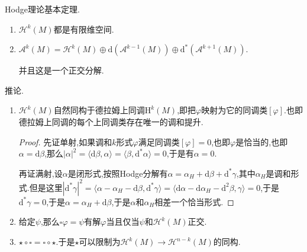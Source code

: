 Hodge理论基本定理.
\begin{enumerate}
	\item $\mathscr{H}^k(M)$都是有限维空间.
	\item $\mathscr{A}^k(M)=\mathscr{H}^k(M)\oplus\mathrm{d}\left(\mathscr{A}^{k-1}(M)\right)\oplus\mathrm{d}^*\left(\mathscr{A}^{k+1}(M)\right)$.
	
	并且这是一个正交分解.
\end{enumerate}

推论.
\begin{enumerate}
	\item $\mathscr{H}^k(M)$自然同构于德拉姆上同调$\mathrm{H}^k(M)$,即把$\varphi$映射为它的同调类$[\varphi]$.也即德拉姆上同调的每个上同调类存在唯一的调和提升.
	\begin{proof}
		
		先证单射,如果调和$k$形式$\varphi$满足同调类$[\varphi]=0$,也即$\varphi$是恰当的,也即$\alpha=\mathrm{d}\beta$,那么$|\alpha|^2=\langle\mathrm{d}\beta,\alpha\rangle=\langle\beta,\mathrm{d}^*\alpha\rangle=0$,于是有$\alpha=0$.
		
		\qquad
		
		再证满射,设$\alpha$是闭形式,按照Hodge分解有$\alpha=\alpha_H+\mathrm{d}\beta+\mathrm{d}^*\gamma$,其中$\alpha_H$是调和形式.但是这里$|\mathrm{d}^*\gamma|^2=\langle\alpha-\alpha_H-\mathrm{d}\beta,\mathrm{d}^*\gamma\rangle=\langle\mathrm{d}\alpha-\mathrm{d}\alpha_H-\mathrm{d}^2\beta,\gamma\rangle=0$,于是$\mathrm{d}^*\gamma=0$,于是$\alpha=\alpha_H+\mathrm{d}\beta$,于是$\alpha$和$\alpha_H$相差一个恰当形式.
	\end{proof}
	\item 给定$\psi$,那么$\square\varphi=\psi$有解$\varphi$当且仅当$\psi$和$\mathscr{H}^k(M)$正交.
	\item $\star\circ\square=\square\circ\star$.于是$\star$可以限制为$\mathscr{H}^k(M)\to\mathscr{H}^{n-k}(M)$的同构.
\end{enumerate}

